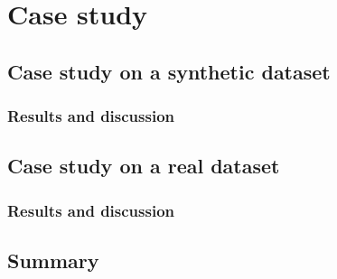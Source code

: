 \chapter{Case study}\label{CaseStudy}
\ifpdf
    \graphicspath{{Chapter5/Chapter5Figs/PNG/}{Chapter5/Chapter5Figs/PDF/}{Chapter5/Chapter5Figs/}}
\else
    \graphicspath{{Chapter5/Chapter5Figs/EPS/}{Chapter5/Chapter5Figs/}}
\fi

\section{Case study on a synthetic dataset}
\subsection{Results and discussion}

\section{Case study on a real dataset}
\subsection{Results and discussion}

\section{Summary}



